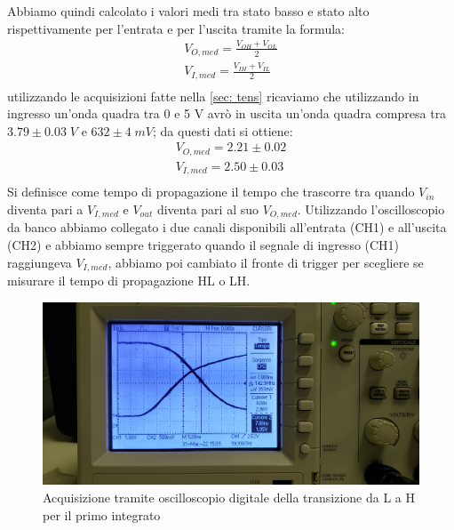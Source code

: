 \documentclass[10pt, a4paper, italian]{article}
\begin{document}
Abbiamo quindi calcolato i valori medi tra stato basso e stato alto rispettivamente per l'entrata e per l'uscita tramite la formula:
\begin{gather*}
V_{O,med}=\frac{V_{OH}+V_{OL}}{2}\\
V_{I,med}=\frac{V_{IH}+V_{IL}}{2}\\
\end{gather*}
utilizzando le acquisizioni fatte nella \cref{sec: tens} ricaviamo che utilizzando in ingresso un'onda quadra tra 0 e 5 V avrò in uscita un'onda quadra compresa tra $3.79 \pm 0.03 \; V$ e $ 632 \pm 4 \; mV$; da questi dati si ottiene:
\begin{gather*}
V_{O,med}=2.21 \pm 0.02\\
V_{I,med}=2.50 \pm 0.03\\
\end{gather*}
Si definisce come tempo di propagazione il tempo che trascorre tra quando $V_{in}$ diventa pari a $V_{I,med}$ e $V_{out}$ diventa pari al suo $V_{O,med}$.
Utilizzando l'oscilloscopio da banco abbiamo collegato i due canali disponibili all'entrata (CH1) e all'uscita (CH2) e abbiamo sempre triggerato quando il segnale di ingresso (CH1) raggiungeva $V_{I,med}$, abbiamo poi cambiato il fronte di trigger per scegliere se misurare il tempo di propagazione HL o LH.
\begin{figure}
	\includegraphics[width=\textwidth]{LH1}
	\caption{Acquisizione tramite oscilloscopio digitale della transizione da L a H per il primo integrato}
\end{figure}
\end{document}

